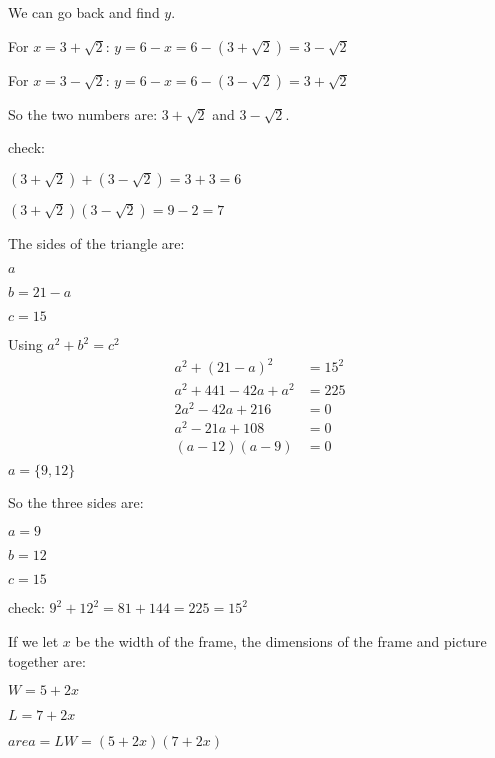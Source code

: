 \documentclass[fleqn,addpoints]{exam}
\begin{document}
\begin{description}
We can go back and find $y$. 
\begin{itemize*}
  \item For $x = 3 + \sqrt{2}$: \( y = 6 - x = 6 - (3+\sqrt{2}) = 3 - \sqrt{2} \)
  \item For $x = 3 - \sqrt{2}$: \( y = 6 - x = 6 - (3-\sqrt{2}) = 3 + \sqrt{2} \) 
\end{itemize*}

So the two numbers are: $3 + \sqrt{2}$ and $3 - \sqrt{2}$.

check:
\begin{itemize*}
  \item $(3 + \sqrt{2}) + (3 - \sqrt{2}) = 3 + 3 = 6$
  \item $(3 + \sqrt{2})(3 - \sqrt{2}) = 9-2 = 7$
\end{itemize*}

\item[49]
The sides of the triangle are:
\begin{itemize*}
  \item $a$
  \item $b=21-a$
  \item $c=15$
\end{itemize*}

Using $a^2+b^2=c^2$
\begin{align*}
  a^2 + (21-a)^2 &= 15^2 \\
  a^2 + 441 -42a + a^2 &= 225 \\
  2a^2 -42a + 216 &= 0 \\
  a^2 -21a + 108 &= 0 \\
  (a-12)(a-9) &= 0 \\
\end{align*}
$a = \{ 9, 12 \}$

So the three sides are: 
\begin{itemize*}
  \item $a=9$
  \item $b=12$
  \item $c=15$
\end{itemize*}

check: $9^2 + 12^2 = 81 + 144 = 225 = 15^2$

\item[52]

If we let $x$ be the width of the frame, the dimensions of the frame and picture together are:
\begin{itemize*}
  \item $W = 5 + 2x$
  \item $L = 7 + 2x$
  \item $area = LW = (5+2x)(7+2x)$
\end{itemize*}


\end{description}
\end{document}
